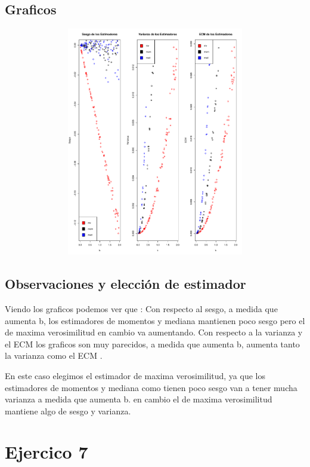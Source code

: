\documentclass[a4paper]{article}
\begin{document}
\subsection{Graficos}
\begin{figure}[H]
	\centering
	\includegraphics[width=15cm, height=10cm]{Ejercicio-6-plot}
\end{figure}

\subsection{Observaciones y elección de estimador}
Viendo los graficos podemos ver que : \newline
Con respecto al sesgo, a medida que aumenta b, los estimadores de momentos y mediana mantienen poco sesgo pero el de maxima verosimilitud en cambio va aumentando. \newline
Con respecto a la varianza y el ECM los graficos son muy parecidos, a medida que aumenta b, aumenta tanto la varianza como el ECM . \newline

En este caso elegimos el estimador de maxima verosimilitud, ya que los estimadores de momentos y mediana como tienen poco sesgo van a tener mucha varianza a medida que aumenta b. en cambio el de maxima verosimilitud mantiene algo de sesgo y varianza.

\section{Ejercico 7}
\end{document}
